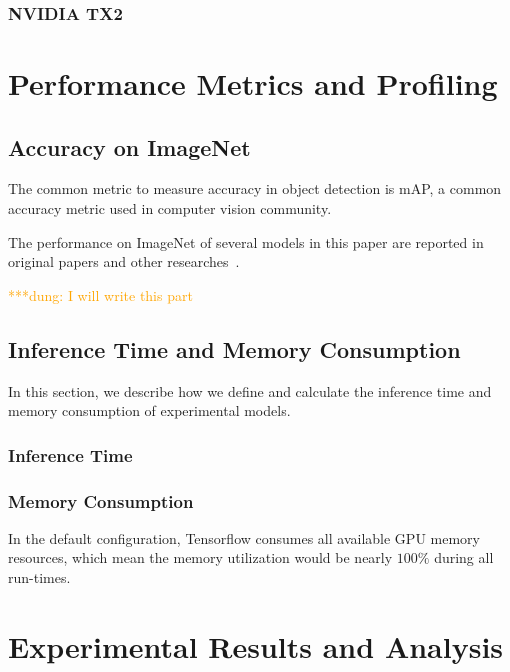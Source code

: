 \documentclass[conference]{IEEEtran}
\newcommand{\dungnote}[1]{ {\textcolor{orange} { ***dung: #1 }}}
\newcommand{\dungnote}[1]{}
\begin{document}
\subsubsection{NVIDIA TX2}

\section{Performance Metrics and Profiling}

\subsection{Accuracy on ImageNet}
The common metric to measure accuracy in object detection is mAP, a common accuracy metric used in computer vision community.

The performance on ImageNet of several models in this paper are reported in original papers and other researches~\cite{huang2017speed}.

\dungnote{I will write this part}

\subsection{Inference Time and Memory Consumption}
In this section, we describe how we define and calculate the inference time and memory consumption of experimental models.



\subsubsection{Inference Time}

\subsubsection{Memory Consumption}
In the default configuration, Tensorflow consumes all available GPU memory resources, which mean the memory utilization would be nearly $100\%$ during all run-times.


\section{Experimental Results and Analysis}
\end{document}
